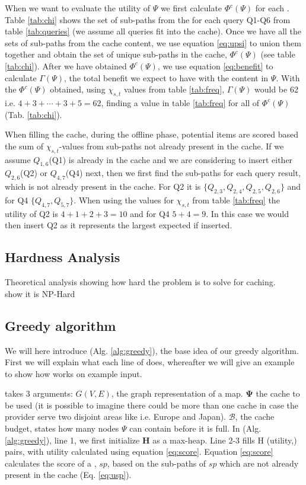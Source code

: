 When we want to evaluate the utility of $\Psi$ we first calculate $\Phi^c(\Psi)$ for each \spathns. Table \ref{tab:chi} shows the set of sub-paths from the \spaths for each query Q1-Q6 from table \ref{tab:queries} (we assume all queries fit into the cache). Once we have all the sets of sub-paths from the cache content, we use equation \ref{eq:upsi} to union them together and obtain the set of unique sub-paths in the cache, $\Phi^c(\Psi)$ (see table \ref{tab:chi}). After we have obtained $\Phi^c(\Psi)$, we use equation \ref{eq:benefit} to calculate $\Gamma(\Psi)$, the total benefit we expect to have with the content in $\Psi$. With the $\Phi^c(\Psi)$ obtained, using $\chi_{s,t}$ values from table \ref{tab:freq}, $\Gamma(\Psi)$ would be 62 i.e. $4+3+\dotsb+3+5 = 62$, finding a value in table \ref{tab:freq} for all \spaths of $\Phi^c(\Psi)$ (Tab. \ref{tab:chi}).

When filling the cache, during the offline phase, potential \spath items are scored based the sum of $\chi_{s,t}$-values from sub-paths not already present in the cache. If we assume $Q_{1,6}$(Q1) is already in the cache and we are considering to insert either $Q_{2,6}$(Q2) or $Q_{4,7}$(Q4) next, then we first find the sub-paths for each query result, which is not already present in the cache. For Q2 it is $\{Q_{2,3},Q_{2,4},Q_{2,5},Q_{2,6}\}$ and for Q4 $\{Q_{4,7},Q_{5,7}\}$. When using the values for $\chi_{s,t}$ from table \ref{tab:freq} the utility of Q2 is $4+1+2+3=10$ and for Q4 $5+4=9$. In this case we would then insert Q2 as it represents the largest expected if inserted.

\subsection{Hardness Analysis}
Theoretical analysis showing how hard the problem is to solve for \spath caching.\\
show it is NP-Hard
 

\subsection{Greedy algorithm}
We will here introduce \salgo (Alg. \ref{alg:greedy}), the base idea of our greedy algorithm. First we will explain what each line of \salgo does, whereafter we will give an example to show how \salgo works on example input.

\salgo takes 3 arguments: $G(V,E)$, the graph representation of a map. $\mathbf{\Psi}$ the cache to be used (it is possible to imagine there could be more than one cache in case the \spath provider serve two disjoint areas like i.e. Europe and Japan). $\mathcal{B}$, the cache budget, states how many nodes $\Psi$ can contain before it is full.
In \salgo (Alg. \ref{alg:greedy}), line 1, we first initialize \textbf{H} as a max-heap. Line 2-3 fills H (utility,\spath) pairs, with utility calculated using equation \ref{eq:score}. 
Equation \ref{eq:score} calculates the score of a \spathns, $sp$, based on the sub-paths of $sp$ which are not already present in the cache (Eq. \ref{eq:usp}).

